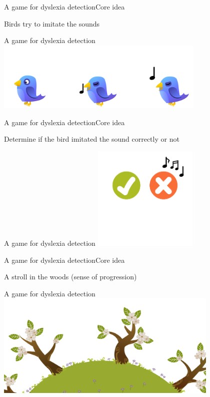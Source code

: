 \documentclass{beamer}
\begin{document}
\begin{slide}{A game for dyslexia detection}{Core idea}{
\item Birds try to imitate the sounds
}\end{slide}

\begin{frame}{A game for dyslexia detection}
\center
\includegraphics[width=10cm]{Pics/bird.png}
\end{frame}

\begin{slide}{A game for dyslexia detection}{Core idea}{
\item Determine if the bird imitated the sound correctly or not
}\end{slide}

\begin{frame}{A game for dyslexia detection}
\center
\includegraphics[height=5cm]{Pics/yes_no_button.png}
\end{frame}

\begin{slide}{A game for dyslexia detection}{Core idea}{
\item A stroll in the woods (sense of progression)
}\end{slide}

\begin{frame}{A game for dyslexia detection}
\center
\includegraphics[height=5cm]{Pics/woods.png}
\end{frame}
\end{document}
